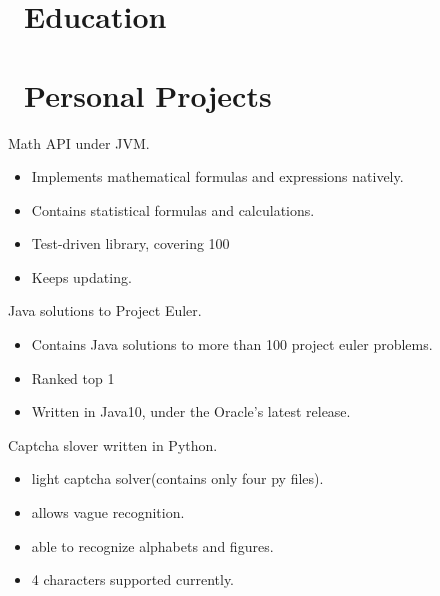 \documentclass{resume}
\begin{document}



\section{\faGraduationCap\ Education}

\section{\faUsers\ Personal Projects}
Math API under JVM.
\begin{itemize}
  \item Implements mathematical formulas and expressions natively.
  \item Contains statistical formulas and calculations.
  \item Test-driven library, covering 100%
  \item Keeps updating.
\end{itemize}

Java solutions to Project Euler.
\begin{itemize}
  \item Contains Java solutions to more than 100 project euler problems.
  \item Ranked top 1%
  \item Written in Java10, under the Oracle's latest release.
\end{itemize}

Captcha slover written in Python.
\begin{itemize}
  \item light captcha solver(contains only four py files).
  \item allows vague recognition.
  \item able to recognize alphabets and figures.
  \item 4 characters supported currently.
\end{itemize}
\end{document}
